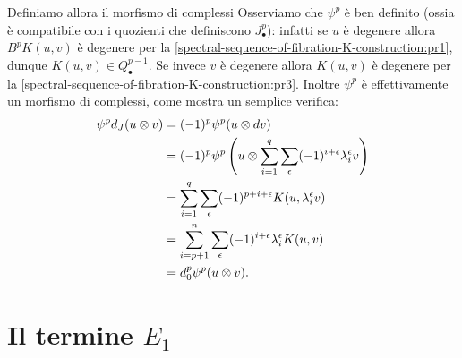 Definiamo allora il morfismo di complessi
Osserviamo che \(\psi^p\) è ben definito (ossia è compatibile con i quozienti che definiscono \(J^p_\bullet\)): infatti se \(u\) è degenere allora \(B^pK(u,v)\) è degenere per la \ref{spectral-sequence-of-fibration-K-construction:pr1}, dunque \(K(u,v)\in Q^{p-1}_\bullet\). Se invece \(v\) è degenere allora \(K(u,v)\) è degenere per la \ref{spectral-sequence-of-fibration-K-construction:pr3}. Inoltre \(\psi^p\) è effettivamente un morfismo di complessi, come mostra un semplice verifica:
\begin{align*}
\psi^pd_J(u\mathbin{\otimes} v)&=(-1)^p\psi^p(u\mathbin{\otimes} dv)\\
&=(-1)^p\psi^p\left(u\mathbin{\otimes}\sum_{i=1}^q\sum_\epsilon(-1)^{i+\epsilon}\lambda^\epsilon_iv\right)\\
&=\sum_{i=1}^q\sum_\epsilon(-1)^{p+i+\epsilon}K(u,\lambda^\epsilon_iv)\\
&=\sum_{i=p+1}^n\sum_\epsilon(-1)^{i+\epsilon}\lambda^\epsilon_iK(u,v)\\
&=d^p_0\psi^p(u\mathbin{\otimes} v).
\end{align*}

\section{Il termine \texorpdfstring{\(E_1\)}{E1}}

